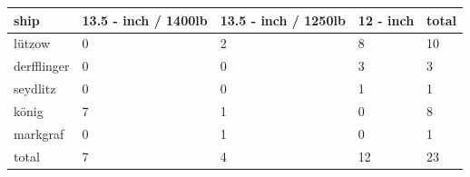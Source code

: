 \documentclass{article}
\begin{document}
\begin{tabular}{lllll}
\toprule
ship & 13.5 - inch / 1400lb & 13.5 - inch / 1250lb & 12 - inch & total \\
\midrule
lützow & 0 & 2 & 8 & 10 \\
derfflinger & 0 & 0 & 3 & 3 \\
seydlitz & 0 & 0 & 1 & 1 \\
könig & 7 & 1 & 0 & 8 \\
markgraf & 0 & 1 & 0 & 1 \\
total & 7 & 4 & 12 & 23 \\
\bottomrule
\end{tabular}
\end{document}
